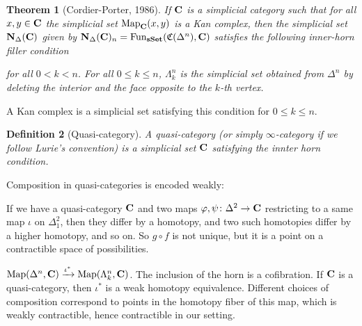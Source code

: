 \documentclass[A4paper, british]{amsart}
\theoremstyle{darkgreentheorem}
\newtheorem{thm}{Theorem}[section]
\theoremstyle{darkbluedefinition}
\newtheorem{defn}[thm]{Definition}
\theoremstyle{darkredexample}
\theoremstyle{remark}
\DeclareMathOperator{\Fun}{Fun}
\DeclareMathOperator{\Map}{Map}
\newcommand{\sSet}{\mathbf{sSet}}
\newcommand{\1}{\mathbbm{1}}
\begin{document}
\begin{thm}[Cordier-Porter, 1986]
    If $\mathbf{C}$ is a simplicial category such that for all $x,y\in \mathbf{C}$ the simplicial set $\Map_{\bfC}(x,y)$ is a Kan complex, then the simplicial set $\mathbf{N}_{\Delta}(\mathbf{C})$ given by $\bfN_{\Delta}(\bfC)_{n}=\Fun_{\sSet}(\mathfrak{C}(\Delta^{n}),\bfC)$ satisfies the following inner-horn filler condition
    \begin{center}
    \end{center}
    for all $0<k<n$.
    For all $0\leqslant k\leqslant n$, $\Lambda_{k}^{n}$ is the simplicial set obtained from $\Delta^{n}$ by deleting the interior and the face opposite to the $k$-th vertex.
\end{thm}

A Kan complex is a simplicial set satisfying this condition for $0\leqslant k\leqslant n$.

\begin{defn}[Quasi-category]
    A \textit{quasi-category} (or simply $\infty$-category if we follow Lurie's convention) is a simplicial set $\mathbf{C}$ satisfying the innter horn condition.
\end{defn}

Composition in quasi-categories is encoded weakly:
\begin{center}
\end{center}

If we have a quasi-category $\mathbf{C}$ and two maps $\varphi,\psi\colon \Delta^{2}\to \mathbf{C}$ restricting to a same map $\iota$ on $\Delta^{2}_{1}$, then they differ by a homotopy, and two such homotopies differ by a higher homotopy, and so on.
So $g\circ f$ is not unique, but it is a point on a contractible space of possibilities.

$\Map(\Delta^{n},\bfC)\xrightarrow{\iota^{*}} \Map(\Lambda_{k}^{n},\bfC)$.
The inclusion of the horn is a cofibration.
If $\mathbf{C}$ is a quasi-category, then $\iota^{*}$ is a weak homotopy equivalence.
Different choices of composition correspond to points in the homotopy fiber of this map, which is weakly contractible, hence contractible in our setting.
\end{document}

